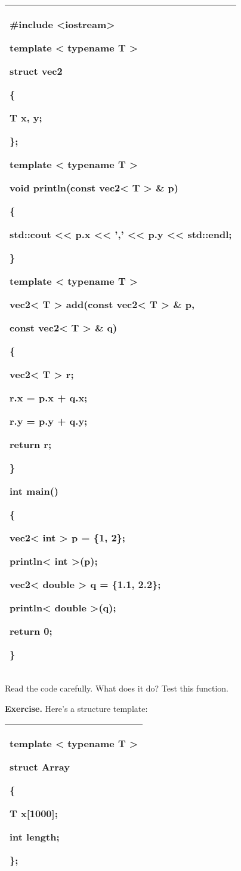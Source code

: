 \documentclass[
]{article}
\begin{document}
\begin{longtable}[]{@{}l@{}}
\toprule
\endhead
\begin{minipage}[t]{0.97\columnwidth}\raggedright
\#include \textless iostream\textgreater{}

template \textless{} typename T \textgreater{}

struct vec2

\{

T x, y;

\};

template \textless{} typename T \textgreater{}

void println(const vec2\textless{} T \textgreater{} \& p)

\{

std::cout \textless\textless{} p.x \textless\textless{} ','
\textless\textless{} p.y \textless\textless{} std::endl;

\}

template \textless{} typename T \textgreater{}

vec2\textless{} T \textgreater{} add(const vec2\textless{} T
\textgreater{} \& p,

const vec2\textless{} T \textgreater{} \& q)

\{

vec2\textless{} T \textgreater{} r;

r.x = p.x + q.x;

r.y = p.y + q.y;

return r;

\}

int main()

\{

vec2\textless{} int \textgreater{} p = \{1, 2\};

println\textless{} int \textgreater(p);

vec2\textless{} double \textgreater{} q = \{1.1, 2.2\};

println\textless{} double \textgreater(q);

return 0;

\}\strut
\end{minipage}\tabularnewline
\bottomrule
\end{longtable}

Read the code carefully. What does it do? Test this function.

\textbf{Exercise.} Here's a structure template:

\begin{longtable}[]{@{}l@{}}
\toprule
\endhead
\begin{minipage}[t]{0.97\columnwidth}\raggedright
template \textless{} typename T \textgreater{}

struct Array

\{

T x{[}1000{]};

int length;

\};\strut
\end{minipage}\tabularnewline
\bottomrule
\end{longtable}
\end{document}
